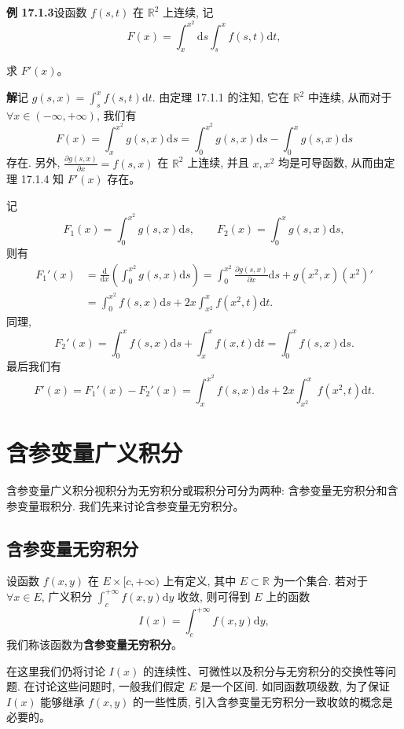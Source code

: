 \documentclass[UTF8,12pt,a4paper,fontset=fandol]{ctexart}
\begin{document}
\noindent\textbf{例 17.1.3}\quad 设函数 $f(s,t)$ 在 $\mathbb R^2$ 上连续, 记
\[
  F(x)=\int_x^{x^2}\mathrm ds\int_s^x f(s,t)\mathrm dt,
\]

\noindent 求 $F'(x)$。

\noindent\textbf{解}\quad 记 $g(s,x)=\int_s^x f(s,t)\mathrm dt$. 由定理 17.1.1 的注知, 它在 $\mathbb R^2$ 中连续, 从而对于 $\forall x\in(-\infty,+\infty)$, 我们有
\[
  F(x)=\int_x^{x^2}g(s,x)\mathrm ds
  =\int_0^{x^2}g(s,x)\mathrm ds-\int_0^x g(s,x)\mathrm ds
\]
存在. 另外, $\frac{\partial g(s,x)}{\partial x}=f(s,x)$ 在 $\mathbb R^2$ 上连续, 并且 $x,x^2$ 均是可导函数, 从而由定理 17.1.4 知 $F'(x)$ 存在。

记
\[
  F_1(x)=\int_0^{x^2}g(s,x)\mathrm ds,\qquad
  F_2(x)=\int_0^x g(s,x)\mathrm ds,
\]
则有
\[
\begin{aligned}
  F_1'(x)
  &=\frac{\mathrm d}{\mathrm dx}\left(\int_0^{x^2}g(s,x)\mathrm ds\right)
    =\int_0^{x^2}\frac{\partial g(s,x)}{\partial x}\mathrm ds
      +g(x^2,x)(x^2)'\\
  &=\int_0^{x^2}f(s,x)\mathrm ds
    +2x\int_{x^2}^x f(x^2,t)\mathrm dt.
\end{aligned}
\]
同理,
\[
  F_2'(x)=\int_0^x f(s,x)\mathrm ds+\int_x^x f(x,t)\mathrm dt
  =\int_0^x f(s,x)\mathrm ds.
\]
最后我们有
\[
  F'(x)=F_1'(x)-F_2'(x)
  =\int_x^{x^2}f(s,x)\mathrm ds+2x\int_{x^2}^x f(x^2,t)\mathrm dt.
\]

\section{含参变量广义积分}

含参变量广义积分视积分为无穷积分或瑕积分可分为两种: 含参变量无穷积分和含参变量瑕积分. 我们先来讨论含参变量无穷积分。

\subsection{含参变量无穷积分}

设函数 $f(x,y)$ 在 $E\times[c,+\infty)$ 上有定义, 其中 $E\subset\mathbb R$ 为一个集合. 若对于 $\forall x\in E$, 广义积分 $\int_c^{+\infty}f(x,y)\mathrm dy$ 收敛, 则可得到 $E$ 上的函数
\[
  I(x)=\int_c^{+\infty}f(x,y)\mathrm dy,
\]
我们称该函数为\textbf{含参变量无穷积分}。

在这里我们仍将讨论 $I(x)$ 的连续性、可微性以及积分与无穷积分的交换性等问题. 在讨论这些问题时, 一般我们假定 $E$ 是一个区间. 如同函数项级数, 为了保证 $I(x)$ 能够继承 $f(x,y)$ 的一些性质, 引入含参变量无穷积分一致收敛的概念是必要的。
\end{document}
